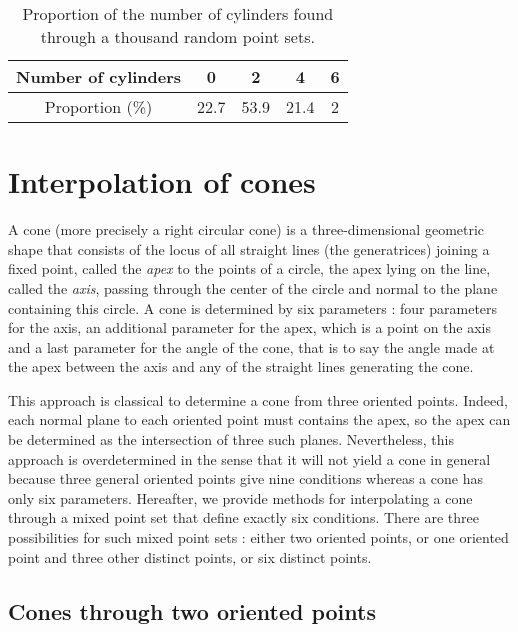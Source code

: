 \documentclass[5p]{elsarticle}
\newcommand{\com}[1]{{\color{black} #1}}
\begin{document}
	
\begin{table}[ht!]
\begin{center}
\begin{tabular}{c|c|c|c|c|}
 Number of cylinders & 0 & 2 & 4 & 6 \\ 
	 \hline
Proportion (\%)	 &  22.7 & 53.9 & 21.4 & 2 \\
\hline	
\end{tabular}
\caption{Proportion of the number of cylinders found through a thousand random point sets.}\label{tab:cylinders5P}
\end{center}
\end{table}


\section{Interpolation of cones}	

A cone (more precisely a right circular cone) is a three-dimensional geometric shape that consists of the locus of all straight lines (the generatrices) joining a fixed point, called the \emph{apex} to the points of a circle, the apex lying on the line, called the \emph{axis}, passing through the center of the circle and normal to the plane containing this circle. A cone is determined by six parameters : four parameters for the axis, an additional parameter for the apex, which is a point on the axis and a last parameter for the angle of the cone, that is to say the angle made at the apex between the axis and any of the straight lines generating the cone.  

\medskip

\com{This approach} is classical to determine a cone from three oriented points. Indeed, each normal plane to each oriented point must contains the apex, so the apex can be determined as the intersection of three such planes. Nevertheless, this approach is overdetermined in the sense that it will not yield a cone in general \com{because} three general oriented points give nine conditions whereas a cone has only six parameters. Hereafter, we provide methods for interpolating a cone through a mixed point set that define exactly six conditions. There are three possibilities \com{for such} mixed point sets : either two oriented points, or one oriented point and three other distinct points, or six distinct points. 


\subsection{Cones through two oriented points} 
\end{document}
